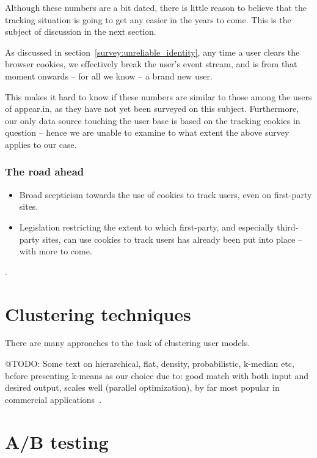 Although these numbers are a bit dated, there is little reason to believe that the tracking situation is going to get any easier in the years to come. This is the subject of discussion in the next section.

As discussed in section~\ref{survey:unreliable_identity}, any time a user clears the browser cookies, we effectively break the user's event stream, and is from that moment onwards -- for all we know -- a brand new user.

This makes it hard to know if these numbers are similar to those among the users of appear.in, as they have not yet been surveyed on this subject. Furthermore, our only data source touching the user base is based on the tracking cookies in question -- hence we are unable to examine to what extent the above survey applies to our case.

\subsubsection{The road ahead}

\begin{itemize}
  \item Broad scepticism towards the use of cookies to track users, even on first-party sites.
  \item Legislation restricting the extent to which first-party, and especially third-party sites, can use cookies to track users has already been put into place -- with more to come.
\end{itemize}

\cite{RuizMartinez2012,Nikiforakis2013,Sorensen2013,Eijk2011}.

\section{Clustering techniques}
\label{survey:sec:clustering_techniques}

There are many approaches to the task of clustering user models.

@TODO: Some text on hierarchical, flat, density, probabilistic, k-median etc, before presenting k-means as our choice due to: good match with both input and desired output, scales well (parallel optimization), by far most popular in commercial applications~\cite{Berkhin2006}.

\section{A/B testing}
\label{survey:sec:ab_testing}

